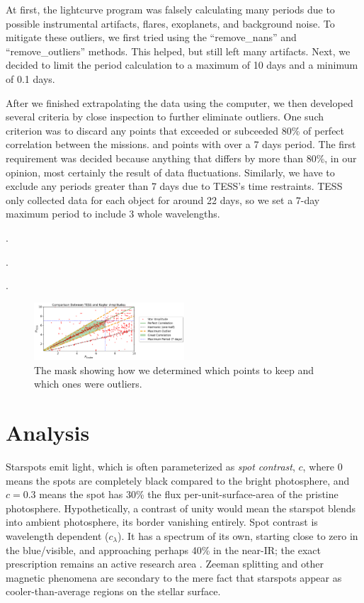 \documentclass[twocolumn]{aastex631}
\begin{document}
At first, the lightcurve program was falsely calculating many periods due to possible instrumental artifacts, flares, exoplanets, and background noise. To mitigate these outliers, we first tried using the \enquote{remove\_nans} and \enquote{remove\_outliers} methods. This helped, but still left many artifacts. Next, we decided to limit the period calculation to a maximum of 10 days and a minimum of 0.1 days.

After we finished extrapolating the data using the computer, we then developed several criteria by close inspection to further eliminate outliers. One such criterion was to discard any points that exceeded or subceeded 80\% of perfect correlation between the missions. and points with over a 7 days period. The first requirement was decided because anything that differs by more than 80\%, in our opinion, most certainly the result of data fluctuations. Similarly, we have to exclude any periods greater than 7 days due to TESS's time restraints. TESS only collected data for each object for around 22 days, so we set a 7-day maximum period to include 3 whole wavelengths.


.

.

.

\begin{figure}[!htb]
  \centering
  \includegraphics[width=0.5\textwidth]{Amplitude Comparison Mask.png}
  \caption{The mask showing how we determined which points to keep and which ones were outliers.}
\end{figure}
\FloatBarrier

\section{Analysis}

Starspots emit light, which is often parameterized as \emph{spot contrast}, $c$, where $0$ means the spots are completely black compared to the bright photosphere, and $c=0.3$ means the spot has 30\% the flux per-unit-surface-area of the pristine photosphere.  Hypothetically, a contrast of unity would mean the starspot blends into ambient photosphere, its border vanishing entirely.  Spot contrast is wavelength dependent ($c_\lambda$). It has a spectrum of its own, starting close to zero in the blue/visible, and approaching perhaps 40\% in the near-IR; the exact prescription remains an active research area \cite{2005LRSP....2....8B}.  Zeeman splitting and other magnetic phenomena are secondary to the mere fact that starspots appear as cooler-than-average regions on the stellar surface.
\end{document}
